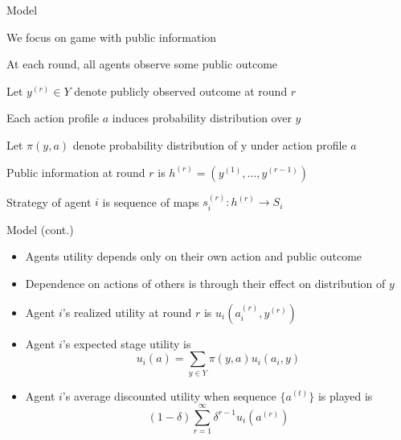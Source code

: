 \documentclass[11pt,aspectratio=169]{beamer}
\begin{document}
  \begin{frame}{Model}
   \begin{itemizes}
    \item We focus on game with \alert{public information}
    \item At each round, \alert{all agents} observe some \alert{public outcome}
    \item Let $y^{(r)} \in Y$ denote publicly observed outcome at round $r$
    \item Each action profile $a$ induces \alert{probability distribution} over $y$
    \item Let $\pi (y, a)$ denote probability distribution of y under action profile $a$
    \item Public information at round $r$ is $h^{(r)}=(y^{(1)}, \dots, y^{(r-1)})$
    \item Strategy of agent $i$ is \alert{sequence of maps} $s_i^{(r)}: h^{(r)} \rightarrow S_i$ 
   \end{itemizes}
  \end{frame}
  
  \begin{frame}{Model (cont.)}
   \begin{itemize}[<+->]
    \item Agents utility depends \alert{only} on their own action and public outcome
    \item Dependence on actions of others is through their effect on distribution of $y$
    \item Agent $i$'s \alert{realized} utility at round $r$ is $u_i(a_i^{(r)}, y^{(r)})$
    \item Agent $i$'s expected stage utility is
    $$
    u_i(a) =\sum_{y\in Y}\pi(y,a)u_i(a_i,y) 
    $$
    \item Agent $i$'s average discounted utility when sequence $\{ a^{(t)}\}$ is played is
    $$
     (1 - \delta)\sum_{r=1}^{\infty}\delta^{r-1} u_i(a^{(r)}) 
    $$
   \end{itemize}
  \end{frame}
  
\end{document}
